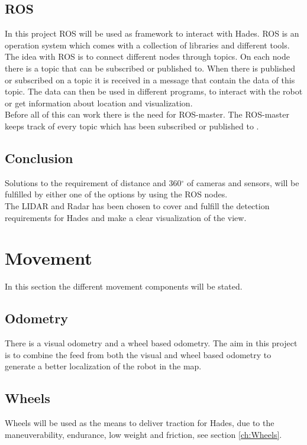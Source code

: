 \subsection{ROS}
In this project ROS will be used as framework to interact with Hades. ROS is an operation system which comes with a collection of libraries and different tools.\\
The idea with ROS is to connect different nodes through topics. On each node there is a topic that can be subscribed or published to. When there is published or subscribed on a topic it is received in a message that contain the data of this topic. The data can then be used in different programs, to interact with the robot or get information about location and visualization. \\
Before all of this can work there is the need for ROS-master. The ROS-master keeps track of every topic which has been subscribed or published to \cite{ROSwiki}.

\subsection{Conclusion}
Solutions to the requirement of distance and 360${^\circ}$ of cameras and sensors, will be fulfilled by either one of the options by using the ROS nodes.\\
The LIDAR and Radar has been chosen to cover and fulfill the detection requirements for Hades and make a clear visualization of the view.

\section{Movement} \label{ch:MovementHades}
In this section the different movement components will be stated.

\subsection{Odometry}
There is a visual odometry and a wheel based odometry. The aim in this project is to combine the feed from both the visual and wheel based odometry to generate a better localization of the robot in the map.

\subsection{Wheels}
Wheels will be used as the means to deliver traction for Hades, due to the maneuverability, endurance, low weight and friction, see section \ref{ch:Wheels}.


